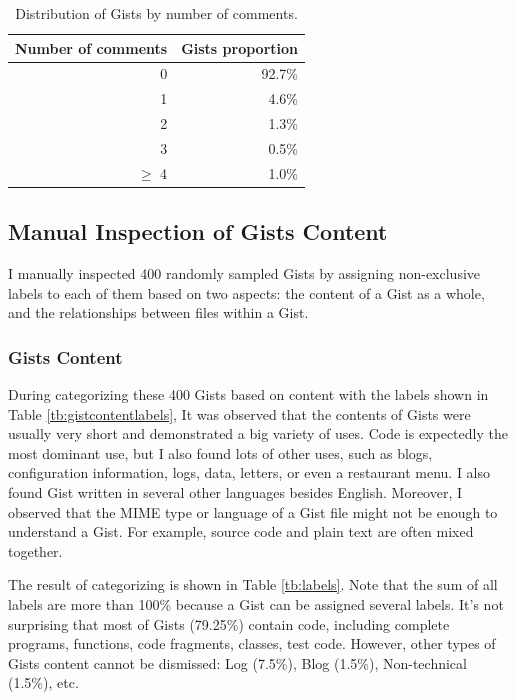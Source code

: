 \begin{table}[!htb]
 \begin{center}
 \begin{tabular}{@{}rr} 
    \textbf{Number of comments} &   \textbf{Gists proportion}\\ \hline
    0 &   92.7\% \\ 
    1 &   4.6\% \\ 
    2 &   1.3\% \\ 
    3 &   0.5\% \\ 
    $\geq$ 4 &   1.0\%\\ \hline
 \end{tabular}
 \end{center}
 \caption{Distribution of Gists by number of comments.}
 \label{tb:comments}
\end{table}

\subsection{Manual Inspection of Gists Content}

I manually inspected 400 randomly sampled Gists by assigning non-exclusive labels to each of them based on two aspects: the content of a Gist as a whole, and the relationships between files within a Gist. 

\subsubsection{Gists Content}
During categorizing these 400 Gists based on content with the labels shown in Table \ref{tb:gistcontentlabels}, It was observed that the contents of Gists were usually very short and demonstrated a big variety of uses. Code is expectedly the most dominant use, but I also found lots of other uses, such as blogs, configuration information, logs, data, letters, or even a restaurant menu. I also found Gist written in several other languages besides English. Moreover, I observed that the MIME type or language of a Gist file might not be enough to understand a Gist. For example, source code and plain text are often mixed together.

The result of categorizing is shown in Table \ref{tb:labels}. Note that the sum of all labels are more than 100\% because a Gist can be assigned several labels. It's not surprising that most of Gists (79.25\%) contain code, including complete programs, functions, code fragments, classes, test code. However, other types of Gists content cannot be dismissed: Log (7.5\%), Blog (1.5\%), Non-technical (1.5\%), etc.

